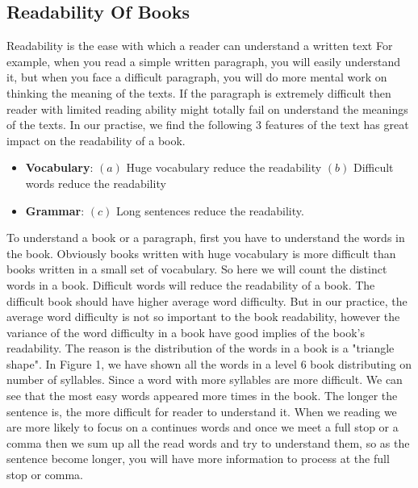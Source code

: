 \documentclass{article}
\begin{document}
\subsection{Readability Of Books}
Readability is the ease with which a reader can understand a written text \cite{readability} For example, when you read a simple written paragraph, you will easily understand it, but when you face a difficult paragraph, you will do more mental work on thinking the meaning of the texts. If the paragraph is extremely difficult then reader with limited reading ability might totally fail on understand the meanings of the texts.
\newline\newline
In our practise, we find the following 3 features of the text has great impact on the readability of a book.
\begin{itemize}
	\item \textbf{Vocabulary}: 	$(a)$ Huge vocabulary reduce the readability \quad $(b)$ Difficult words reduce the readability
	\item \textbf{Grammar}: $(c)$ Long sentences reduce the readability. 
\end{itemize}
To understand a book or a paragraph, first you have to understand the words in the book. Obviously books written with huge vocabulary is more difficult than books written in a small set of vocabulary. So here we will count the distinct words in a book.
\newline
\newline
Difficult words will reduce the readability of a book. The difficult book should have higher average word difficulty. But in our practice, the average word difficulty is not so important to the book readability, however the variance of the word difficulty in a book have good implies of the book's readability. The reason is the distribution of the words in a book is a "triangle shape". In Figure 1, we have shown all the words in a level 6 book distributing on number of syllables. Since a word with more syllables are more difficult\cite{fry}. We can see that the most easy words appeared more times in the book. 
\newline
\newline
The longer the sentence is, the more difficult for reader to understand it. When we reading we are more likely to focus on a continues words and once we meet a full stop or a comma then we sum up all the read words and try to understand them, so as the sentence become longer, you will have more information to process at the full stop or comma.
\newline
\newline
\end{document}
